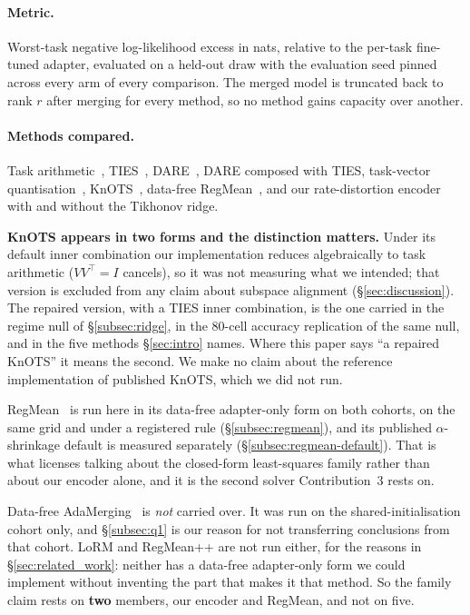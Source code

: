 \paragraph{Metric.} Worst-task negative log-likelihood excess in nats,
relative to the per-task fine-tuned adapter, evaluated on a held-out
draw with the evaluation seed pinned across every arm of every
comparison. The merged model is truncated back to rank $r$ after merging
for every method, so no method gains capacity over another.

\paragraph{Methods compared.} Task arithmetic~\citep{ilharco2023task},
TIES~\citep{yadav2023ties}, DARE~\citep{yu2024dare}, DARE composed with
TIES, task-vector quantisation~\citep{kim2025tvq},
KnOTS~\citep{stoica2025knots}, data-free RegMean~\citep{jin2023regmean}, and
our rate-distortion encoder with and without the Tikhonov ridge.

\textbf{KnOTS appears in two forms and the distinction matters.} Under its
default inner combination our implementation reduces algebraically to task
arithmetic ($VV^\top = I$ cancels), so it was not measuring what we intended;
that version is excluded from any claim about subspace alignment
(\S\ref{sec:discussion}). The repaired version, with a TIES inner
combination, is the one carried in the regime null of \S\ref{subsec:ridge},
in the $80$-cell accuracy replication of the same null, and in the five
methods \S\ref{sec:intro} names. Where this paper says ``a repaired KnOTS''
it means the second. We make no claim about the reference implementation of
published KnOTS, which we did not run.

RegMean~\citep{jin2023regmean} is run here in its data-free
adapter-only form on both cohorts, on the same grid and under a registered
rule (\S\ref{subsec:regmean}), and its published $\alpha$-shrinkage default
is measured separately (\S\ref{subsec:regmean-default}). That is what
licenses talking about the closed-form least-squares family rather than about
our encoder alone, and it is the second solver Contribution~3 rests on.

Data-free AdaMerging~\citep{adamerging2024} is \emph{not} carried over. It was
run on the shared-initialisation cohort only, and \S\ref{subsec:q1} is our
reason for not transferring conclusions from that cohort. LoRM and RegMean++
are not run either, for the reasons in \S\ref{sec:related_work}: neither has a
data-free adapter-only form we could implement without inventing the part that
makes it that method. So the family claim rests on \textbf{two} members, our
encoder and RegMean, and not on five.

